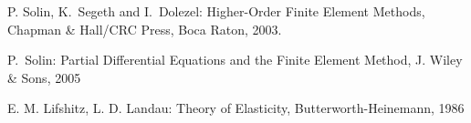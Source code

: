 \begin{thebibliography}{1}


P. Solin, K.~Segeth and I.~Dolezel:
{ Higher-Order Finite Element Methods},
Chapman \& Hall/CRC Press, Boca Raton, 2003.

P.~Solin: Partial Differential Equations and the Finite Element Method,
J. Wiley \& Sons, 2005

E. M. Lifshitz, L. D. Landau: 
Theory of Elasticity,
Butterworth-Heinemann, 1986




\end{thebibliography}
